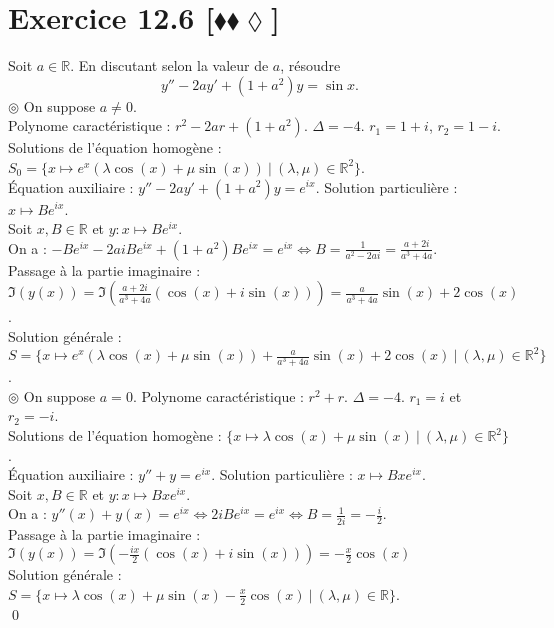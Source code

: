 \documentclass[10pt]{article}
\begin{document}
\section*{Exercice 12.6 [$\blacklozenge\blacklozenge\lozenge$]}
\begin{tcolorbox}[enhanced, width=7in, center, size=fbox, fontupper=\large, drop shadow southwest]
    Soit $a\in\mathbb{R}$. En discutant selon la valeur de $a$, résoudre
    \begin{equation*}
        y'' - 2ay' + (1+a^2)y = \sin x.
    \end{equation*}
    $\circledcirc$ On suppose $a\neq0$.\\
    Polynome caractéristique : $r^2 - 2ar + (1 + a^2)$. $\Delta = -4$. $r_1 = 1 + i$, $r_2 = 1 - i$.\\
    Solutions de l'équation homogène : $S_0 = \{x\mapsto e^{x}\left( \lambda \cos(x) + \mu \sin(x) \right) ~ | ~ (\lambda, \mu)\in\mathbb{R}^2\}$.\\
    Équation auxiliaire : $y'' - 2ay' + (1+a^2)y = e^{ix}$. Solution particulière : $x\mapsto Be^{ix}$.\\
    Soit $x,B \in \mathbb{R}$ et $y:x\mapsto Be^{ix}$.\\
    On a : $-Be^{ix} - 2aiBe^{ix} + (1 + a^2)Be^{ix} = e^{ix} \iff B = \frac{1}{a^2-2ai} = \frac{a+2i}{a^3+4a}$.\\
    Passage à la partie imaginaire : $\Im(y(x))=\Im\left( \frac{a+2i}{a^3+4a}(\cos(x)+i\sin(x)) \right)=\frac{a}{a^3+4a}\sin(x) + 2\cos(x)$.\\
    Solution générale : $S=\{x\mapsto e^x(\lambda\cos(x) + \mu\sin(x)) + \frac{a}{a^3+4a}\sin(x) + 2\cos(x) ~ | ~ (\lambda, \mu)\in\mathbb{R}^2\}$.\\[0.2cm]
    $\circledcirc$ On suppose $a=0$.
    Polynome caractéristique : $r^2 + r$. $\Delta = -4$. $r_1 = i$ et $r_2 = -i$.\\
    Solutions de l'équation homogène : $\{x\mapsto \lambda\cos(x) + \mu\sin(x) ~ | ~ (\lambda, \mu)\in\mathbb{R}^2\}$.\\
    Équation auxiliaire : $y'' + y = e^{ix}$. Solution particulière : $x\mapsto Bxe^{ix}$.\\
    Soit $x,B\in\mathbb{R}$ et $y:x\mapsto Bxe^{ix}$.\\
    On a : $y''(x) + y(x) = e^{ix} \iff 2iBe^{ix} = e^{ix} \iff B = \frac{1}{2i} = -\frac{i}{2}$.\\
    Passage à la partie imaginaire : $\Im(y(x)) = \Im(-\frac{ix}{2}(\cos(x)+i\sin(x)))=-\frac{x}{2}\cos(x)$\\
    Solution générale : $S=\{x\mapsto \lambda\cos(x) + \mu\sin(x) - \frac{x}{2}\cos(x) ~ | ~ (\lambda, \mu)\in\mathbb{R}\}$.\\
    \qed
\end{tcolorbox}
\end{document}
